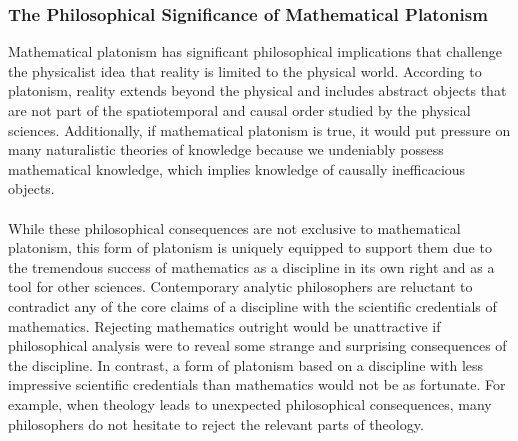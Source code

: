 \documentclass[10pt,a4paper]{article}
\newcounter{theo}
\begin{document}
                    \subsubsection{The Philosophical Significance of Mathematical Platonism}
                        Mathematical platonism has significant philosophical implications that challenge the physicalist idea that reality is limited to the physical world. According to platonism, reality extends beyond the physical and includes abstract objects that are not part of the spatiotemporal and causal order studied by the physical sciences. Additionally, if mathematical platonism is true, it would put pressure on many naturalistic theories of knowledge because we undeniably possess mathematical knowledge, which implies knowledge of causally inefficacious objects.
                        \\
                        \\
                        While these philosophical consequences are not exclusive to mathematical platonism, this form of platonism is uniquely equipped to support them due to the tremendous success of mathematics as a discipline in its own right and as a tool for other sciences. Contemporary analytic philosophers are reluctant to contradict any of the core claims of a discipline with the scientific credentials of mathematics. Rejecting mathematics outright would be unattractive if philosophical analysis were to reveal some strange and surprising consequences of the discipline. In contrast, a form of platonism based on a discipline with less impressive scientific credentials than mathematics would not be as fortunate. For example, when theology leads to unexpected philosophical consequences, many philosophers do not hesitate to reject the relevant parts of theology.
\end{document}
